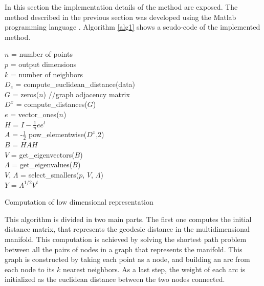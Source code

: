 \documentclass[12pt,journal]{IEEEtran}
\begin{document}
In this section the implementation details of the method are exposed. The method
described in the previous section was developed using the Matlab programming
language \cite{matlab}. Algorithm \ref{alg1} shows a seudo-code of the
implemented method.

\begin{algorithm}
    $n$ = number of points\\
    $p$ = output dimensions\\
    $k$ = number of neighbors\\
    \vspace{0.5cm}
    $D_e$ = compute\_euclidean\_distance(data)\\
    $G$ = zeros($n$) //graph adjacency matrix\\
    \vspace{0.5cm}
    $D^x$ = compute\_distances($G$)\\
    \vspace{0.5cm}
    $e$ = vector\_ones($n$)\\
    $H$ = $I - \frac{1}{n} e e^t$\\
    $A$ = -$\frac{1}{2}$ pow\_elementwise($D^x$,2)\\
    $B$ = $HAH$\\
    $V$ = get\_eigenvectors($B$)\\
    $\Lambda$ = get\_eigenvalues($B$)\\
    $V$, $\Lambda$ = select\_smallers($p$, $V$, $\Lambda$)\\
    $Y$ = $\Lambda^{1/2} V^t$

    \vspace{0.5cm}

    \caption{Computation of low dimensional representation}
    \label{alg1}
\end{algorithm}

This algorithm is divided in two main parts. The first one computes the initial
distance matrix, that represents the geodesic distance in the multidimensional
manifold. This computation is achieved by solving the shortest path problem
between all the pairs of nodes in a graph that represents the manifold. This
graph is constructed by taking each point as a node, and building an arc from
each node to its $k$ nearest neighbors. As a last step, the weight of each arc
is initialized as the euclidean distance between the two nodes connected.
\end{document}
